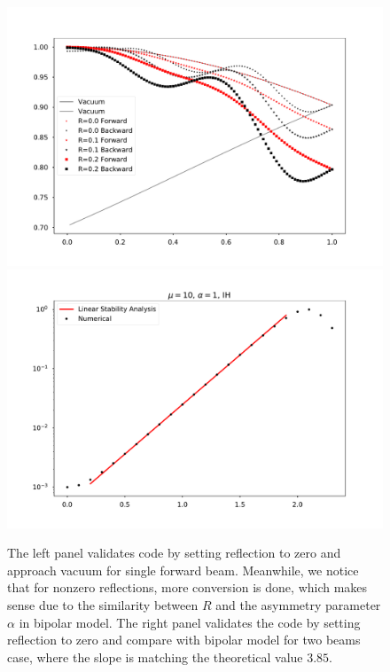 \begin{figure}[htbp]
    \includegraphics[width=\textwidth]{chapters/assets/halo/halo-mu-4-r-multiple.pdf}
    \endminipage\hfill
    \includegraphics[width=\textwidth]{chapters/assets/halo/halo-mu-4-compare-bipolar.pdf}
    \endminipage\hfill
    \caption{The left panel validates code by setting reflection to zero and approach vacuum for single forward beam. Meanwhile, we notice that for nonzero reflections, more conversion is done, which makes sense due to the similarity between $R$ and the asymmetry parameter $\alpha$ in bipolar model. The right panel validates the code by setting reflection to zero and compare with bipolar model for two beams case, where the slope is matching the theoretical value $3.85$.}
    \label{chap:halo-sec:num-fig:compare-vac-bipolar}
\end{figure}

